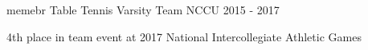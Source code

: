 

\begin{cventries}
  \cventry
    {memebr} %
    {Table Tennis Varsity Team} %
    {NCCU} %
    {2015 - 2017} %
    {
     \begin{cvitems}
       \item {4th place in team event at 2017 National Intercollegiate Athletic Games}
     \end{cvitems}
    }

\end{cventries}
